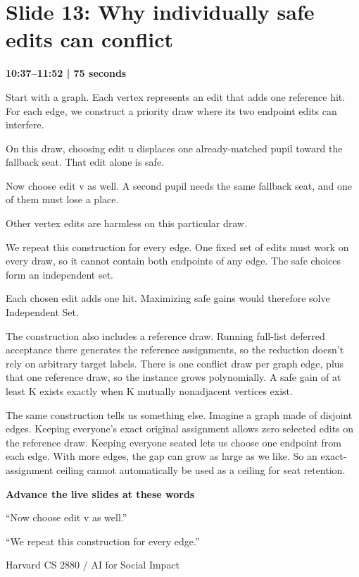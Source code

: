 \documentclass[11pt]{article}
\begin{document}
\section*{Slide 13: Why individually safe edits can conflict}
{\color{navy}\textbf{10:37--11:52 | 75 seconds}}\par\medskip
Start with a graph. Each vertex represents an edit that adds one reference hit. For each edge, we construct a priority draw where its two endpoint edits can interfere.
\par
On this draw, choosing edit u displaces one already-matched pupil toward the fallback seat. That edit alone is safe.
\par
Now choose edit v as well. A second pupil needs the same fallback seat, and one of them must lose a place.
\par
Other vertex edits are harmless on this particular draw.
\par
We repeat this construction for every edge. One fixed set of edits must work on every draw, so it cannot contain both endpoints of any edge. The safe choices form an independent set.
\par
Each chosen edit adds one hit. Maximizing safe gains would therefore solve Independent Set.
\par
The construction also includes a reference draw. Running full-list deferred acceptance there generates the reference assignments, so the reduction doesn't rely on arbitrary target labels. There is one conflict draw per graph edge, plus that one reference draw, so the instance grows polynomially. A safe gain of at least K exists exactly when K mutually nonadjacent vertices exist.
\par
The same construction tells us something else. Imagine a graph made of disjoint edges. Keeping everyone's exact original assignment allows zero selected edits on the reference draw. Keeping everyone seated lets us choose one endpoint from each edge. With more edges, the gap can grow as large as we like. So an exact-assignment ceiling cannot automatically be used as a ceiling for seat retention.
\par
\vfill{\small\textbf{Advance the live slides at these words}\par}
{\small ``Now choose edit v as well.''}\par
{\small ``We repeat this construction for every edge.''}\par
\newpage
{\small Harvard CS 2880 / AI for Social Impact}\par
\end{document}
